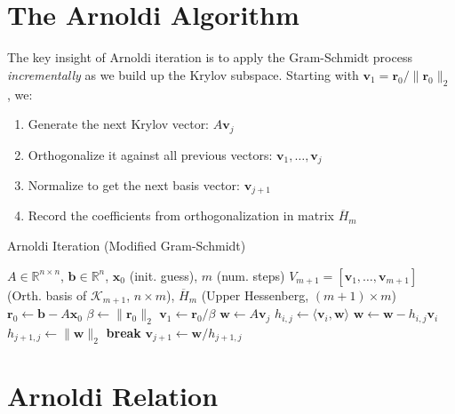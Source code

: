 \section{The Arnoldi Algorithm}

The key insight of Arnoldi iteration is to apply the Gram-Schmidt process \emph{incrementally} as we build up the Krylov subspace. Starting with $\mathbf{v}_1 = \mathbf{r}_0/\|\mathbf{r}_0\|_2$, we:

\begin{enumerate}
\item Generate the next Krylov vector: $A\mathbf{v}_j$
\item Orthogonalize it against all previous vectors: $\mathbf{v}_1, \ldots, \mathbf{v}_j$
\item Normalize to get the next basis vector: $\mathbf{v}_{j+1}$
\item Record the coefficients from orthogonalization in matrix $\overline{H}_m$
\end{enumerate}

\begin{algorithm}[H]
  \caption{Arnoldi Iteration (Modified Gram-Schmidt)}\label{alg:arnoldi}
  \begin{algorithmic}[1]
    \Require $A\in\mathbb{R}^{n\times n}$, $\mathbf{b}\in\mathbb{R}^n$, $\mathbf{x}_0$ (init. guess), $m$ (num. steps)
    \Ensure  $V_{m+1} = [\mathbf{v}_1, \ldots, \mathbf{v}_{m+1}]$ (Orth. basis of $\mathcal{K}_{m+1}$, $n\times m$), $\overline{H}_m$ (Upper Hessenberg, $(m+1)\times m$)
    \State $\mathbf{r}_0 \gets \mathbf{b} - A\mathbf{x}_0$ 
    \State $\beta \gets \|\mathbf{r}_0\|_2$
    \State $\mathbf{v}_1 \gets \mathbf{r}_0/\beta$
      \State $\mathbf{w} \gets A\mathbf{v}_j$
        \State $h_{i,j} \gets \langle\mathbf{v}_i, \mathbf{w}\rangle$
        \State $\mathbf{w} \gets \mathbf{w} - h_{i,j}\mathbf{v}_i$
      \EndFor
      \State $h_{j+1,j} \gets \|\mathbf{w}\|_2$
        \State \textbf{break} 
      \EndIf
      \State $\mathbf{v}_{j+1} \gets \mathbf{w}/h_{j+1,j}$
    \EndFor
  \end{algorithmic}
\end{algorithm}

\section{Arnoldi Relation}

